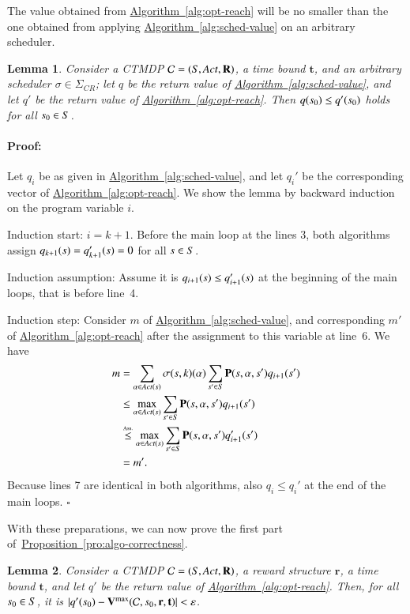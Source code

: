 \documentclass[10pt,twocolumn]{article}
\newenvironment{proof}{\paragraph{Proof:}}{\hfill$\square$}
\newtheorem{lemma}{Lemma}
\newcommand{\states} {{\ensuremath S}}
\newcommand{\state}  {{\ensuremath s}}
\newcommand{\sched}  {{\ensuremath {\sigma}}}
\newcommand{\acts}{\mathit{Act}}
\newcommand{\pmat}{\mathbf{P}}
\newcommand{\rmat}{\mathbf{R}}
\newcommand{\cmodel}{\mathcal{C}}
\newcommand{\act}{\alpha}
\newcommand{\schedscr}{\Sigma_\mathit{CR}}
\newcommand{\rew}{\mathbf{r}}
\newcommand{\timeb}{\mathbf{t}}
\newcommand{\mvalue}{\mathbf{V}}
\newcommand{\precision}{\varepsilon}
\newcommand{\refpro}[1]{\texorpdfstring{\hyperref[pro:#1]{Proposition~\ref*{pro:#1}}}{Proposition~\ref*{pro:#1}}}
\newcommand{\refalg}[1]{\texorpdfstring{\hyperref[alg:#1]{Algorithm~\ref*{alg:#1}}}{Algorithm~\ref*{alg:#1}}}
\begin{document}
The value obtained from \refalg{opt-reach} will be no smaller than the one obtained from applying \refalg{sched-value} on an arbitrary scheduler.
\begin{lemma}
\label{lem:opt-val-nosmaller}
Consider a CTMDP $\cmodel = (\states, \acts, \rmat)$, a time bound $\timeb$, and an arbitrary scheduler $\sched \in \schedscr$;
let $q$ be the return value of \refalg{sched-value}, and let $q'$ be the return value of \refalg{opt-reach}.
Then $q(\state_0) \leq q'(\state_0)$ holds for all $\state_0 \in \states$.
\end{lemma}

\begin{proof}
  Let $q_i$ be as given in \refalg{sched-value}, and let $q_i'$ be the corresponding vector of \refalg{opt-reach}.
  We show the lemma by backward induction on the program variable $i$.

  Induction start: $i = k+1$. Before the main loop at the lines 3, both algorithms assign $q_{k+1}(\state) = q_{k+1}'(\state) = 0$ for all $\state \in \states$.

  Induction assumption: Assume it is $q_{i+1}(\state) \leq q'_{i+1}(\state)$ at the beginning of the main loops, that is before line~4.

  Induction step: Consider $m$ of \refalg{sched-value}, and corresponding $m'$ of \refalg{opt-reach} after the assignment to this variable at line~6.
  We have
\begin{equation*}
  \begin{split}
    m & = \sum_{\act \in \acts(\state)} \sched(\state,k)(\act) \sum_{\state' \in S} \pmat(s,\act,s')
    q_{i+1}(s') \\
    & \leq \max_{\act \in \acts(\state)} \sum_{\state' \in S} \pmat(s,\act,s')
    q_{i+1}(s') \\
    & \stackrel{\mbox{\tiny Ass.}}{\leq} \max_{\act \in \acts(\state)} \sum_{\state' \in S} \pmat(s,\act,s')
    q_{i+1}'(s') \\
    & = m' .
  \end{split}
  \end{equation*}
Because lines 7 are identical in both algorithms, also $q_i \leq q_i'$ at the end of the main loops.  
\end{proof}

With these preparations, we can now prove the first part of~\refpro{algo-correctness}.
\begin{lemma}
\label{lem:algo-correctness}
Consider a CTMDP $\cmodel = (\states, \acts, \rmat)$, a reward structure $\rew$, a time bound $\timeb$, and let $q'$ be the return value of \refalg{opt-reach}.
Then, for all $\state_0 \in \states$, it is $|q'(\state_0) - \mvalue^{\max}(\cmodel, \state_0, \rew, \timeb)| < \precision$.
\end{lemma}
\end{document}
